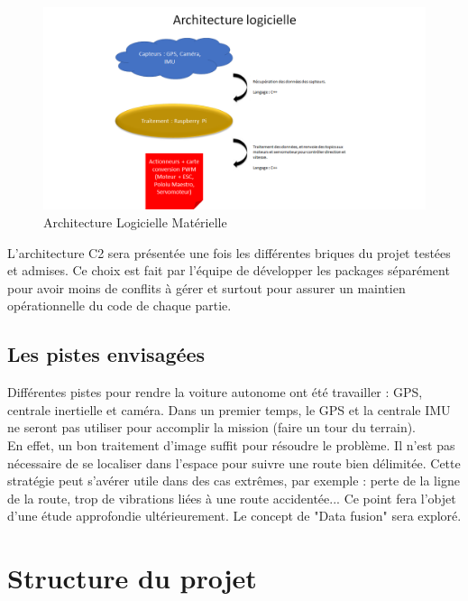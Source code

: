 \documentclass[12pt, openany]{report}
\begin{document}
      \begin{figure}[!h]
      \begin{center}
        \hfill \includegraphics[scale=0.6]{imgs/Architecture_Logicielle_Materielle.png} \hspace*{\fill}
        \caption{Architecture Logicielle Matérielle}
      \end{center}
      \end{figure}
      
L'architecture C2 sera présentée une fois les différentes briques du projet testées et admises. Ce choix est fait par l'équipe de développer les packages séparément pour avoir moins de conflits à gérer et surtout pour assurer un maintien opérationnelle du code de chaque partie.

\subsection{Les pistes envisagées}
Différentes pistes pour rendre la voiture autonome ont été travailler : GPS, centrale inertielle et caméra. Dans un premier temps, le GPS et la centrale IMU ne seront pas utiliser pour accomplir la mission (faire un tour du terrain).\\

En effet, un bon traitement d'image suffit pour résoudre le problème. Il n'est pas nécessaire de se localiser dans l'espace pour suivre une route bien délimitée. Cette stratégie peut s'avérer utile dans des cas extrêmes, par exemple : perte de la ligne de la route, trop de vibrations liées à une route accidentée... Ce point fera l'objet d'une étude approfondie ultérieurement. Le concept de "Data fusion" sera exploré. 

\section{Structure du projet}
\end{document}

